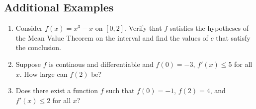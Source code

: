\documentclass[10pt]{book}
\theoremstyle{definition}
\begin{document}
\subsection*{Additional Examples}
\begin{enumerate}[label=(\alph*)]
    \item Consider $f(x)=x^3-x$ on $[0,2]$. Verify that $f$ satisfies the hypotheses of the Mean Value Theorem on the interval and find the values of $c$ that satisfy the conclusion.\vspace{4cm}
    \item Suppose $f$ is continous and differentiable and $f(0)=-3$, $f'(x)\leq 5$ for all $x$. How large can $f(2)$ be?\vspace{4cm}
    \item Does there exist a function $f$ such that $f(0)=-1$, $f(2)=4$, and $f'(x)\leq 2$ for all $x$?
\end{enumerate}
\end{document}
